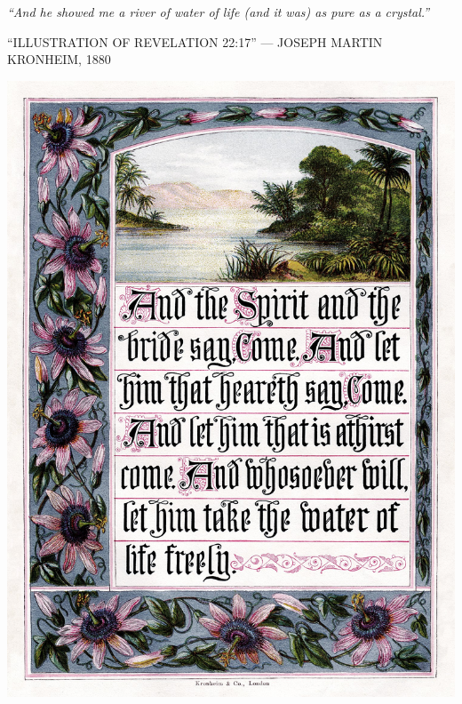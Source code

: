 \clearpage
\thispagestyle{empty}
\null\vfill
\settowidth{}
\begin{center}
\parbox{\longest}{%
  \raggedright{\huge\itshape%
    ``And he showed me a river of water of life (and it was) as pure as a crystal.'' \par\bigskip
  }
  \raggedleft\Large\MakeUppercase{``Illustration of Revelation 22:17'' — Joseph Martin Kronheim, 1880}\par%
}
\vfill\vfill
\clearpage\newpage
\end{center}
\newpage
\thispagestyle{empty}
\begin{center}
	\includegraphics[width=1\textwidth]{images/illustrations/kronheimquote}
\end{center}
